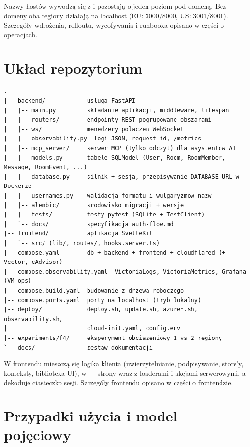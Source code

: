 Nazwy hostów wywodzą się z  i pozostają o jeden poziom pod domeną.
Bez domeny oba regiony działają na localhost (EU: 3000/8000, US: 3001/8001). Szczegóły
wdrożenia, rolloutu, wycofywania i runbooka opisano w części o operacjach.

\section{Układ repozytorium}
\label{sec:arch-repo}

\begin{lstlisting}[basicstyle=\ttfamily\footnotesize]
.
|-- backend/            usluga FastAPI
|   |-- main.py         skladanie aplikacji, middleware, lifespan
|   |-- routers/        endpointy REST pogrupowane obszarami
|   |-- ws/             menedzery polaczen WebSocket
|   |-- observability.py  logi JSON, request id, /metrics
|   |-- mcp_server/     serwer MCP (tylko odczyt) dla asystentow AI
|   |-- models.py       tabele SQLModel (User, Room, RoomMember, Message, RoomEvent, ...)
|   |-- database.py     silnik + sesja, przepisywanie DATABASE_URL w Dockerze
|   |-- usernames.py    walidacja formatu i wulgaryzmow nazw
|   |-- alembic/        srodowisko migracji + wersje
|   |-- tests/          testy pytest (SQLite + TestClient)
|   `-- docs/           specyfikacja auth-flow.md
|-- frontend/           aplikacja SvelteKit
|   `-- src/ (lib/, routes/, hooks.server.ts)
|-- compose.yaml        db + backend + frontend + cloudflared (+ Vector, cAdvisor)
|-- compose.observability.yaml  VictoriaLogs, VictoriaMetrics, Grafana (VM ops)
|-- compose.build.yaml  budowanie z drzewa roboczego
|-- compose.ports.yaml  porty na localhost (tryb lokalny)
|-- deploy/             deploy.sh, update.sh, azure*.sh, observability.sh,
|                       cloud-init.yaml, config.env
|-- experiments/f4/     eksperyment obciazeniowy 1 vs 2 regiony
`-- docs/               zestaw dokumentacji
\end{lstlisting}

W  frontendu mieszczą się logika klienta (uwierzytelnianie, podpisywanie,
store'y, konteksty, biblioteka UI), w  --- strony wraz z loaderami i akcjami
serwerowymi, a  dekoduje ciasteczko sesji. Szczegóły frontendu
opisano w części o frontendzie.

\section{Przypadki użycia i model pojęciowy}
\label{sec:arch-uc}

